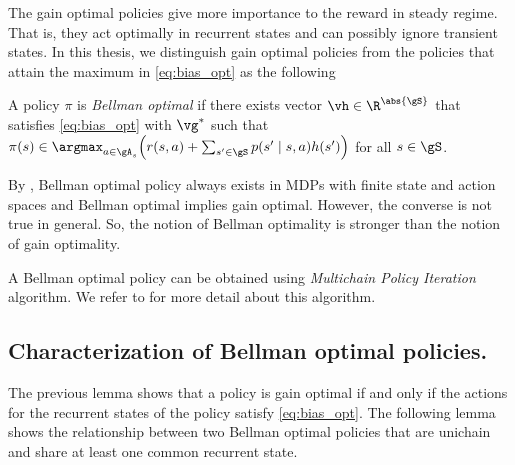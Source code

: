 The gain optimal policies give more importance to the reward in steady regime. 
That is, they act optimally in recurrent states and can possibly ignore transient states.
In this thesis, we distinguish gain optimal policies from the policies that attain the maximum in \eqref{eq:bias_opt} as the following
\begin{defn}[Bellman optimal policy]
    A policy $\pi$ is \emph{Bellman optimal} if there exists vector $\vh\in\R^{\abs{\gS}}$ that satisfies \eqref{eq:bias_opt} with $\vg^*$ such that $\pi(s)\in\argmax_{a\in\gA_s}\Big(r(s,a) +\sum_{s'\in\gS}p(s'\mid s,a)h(s')\Big)$ for all $s\in\gS$.
\end{defn}
By \cite[Theorem~9.1.7]{puterman2014markov}, Bellman optimal policy always exists in MDPs with finite state and action spaces and Bellman optimal implies gain optimal.
However, the converse is not true in general.
So, the notion of Bellman optimality is stronger than the notion of gain optimality.

A Bellman optimal policy can be obtained using \emph{Multichain Policy Iteration} algorithm.
We refer to \cite[Section~9.2.1]{puterman2014markov} for more detail about this algorithm.


\subsection{Characterization of Bellman optimal policies.}

The previous lemma shows that a policy is gain optimal if and only if the actions for the recurrent states of the policy satisfy \eqref{eq:bias_opt}.
The following lemma shows the relationship between two Bellman optimal policies that are unichain and share at least one common recurrent state.

